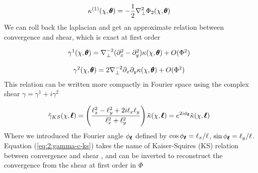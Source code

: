 \begin{equation}
\label{eq:2:kappa-1-lapl}
\kappa^{(1)}(\chi,\pmb{\theta}) = -\frac{1}{2}\nabla_\perp^2 \Phi_2(\chi,\pmb{\theta})
\end{equation}
%
We can roll back the laplacian and get an approximate relation between convergence and shear, which is exact at first order

\begin{equation}
\label{eq:2:gamma-1-lapl}
\begin{matrix}
\gamma^1(\chi,\pmb{\theta}) = \nabla_\perp^{-2} (\partial_x^2-\partial_y^2) \kappa(\chi,\pmb{\theta}) + O(\Phi^2) \\ \\
\gamma^2(\chi,\pmb{\theta}) = 2\nabla_\perp^{-2} \partial_x\partial_y \kappa(\chi,\pmb{\theta}) + O(\Phi^2)
\end{matrix}
\end{equation}
%
This relation can be written more compactly in Fourier space using the complex shear $\gamma=\gamma^1+i\gamma^2$  

\begin{equation}
\label{eq:2:gamma-c-ks}
\tilde{\gamma}_{KS}(\chi,\pmb{\ell}) = \left(\frac{\ell_x^2-\ell_y^2+2i\ell_x\ell_y}{\ell_x^2+\ell_y^2}\right) \tilde{\kappa}(\chi,\pmb{\ell}) = e^{2i\phi_{\pmb{\ell}}} \tilde{\kappa}(\chi,\pmb{\ell})
\end{equation}
%
Where we introduced the Fourier angle $\phi_{\pmb{\ell}}$ defined by $\cos \phi_{\pmb{\ell}} = \ell_x/\ell$, $\sin\phi_{\pmb{\ell}}=\ell_y/\ell$. Equation (\ref{eq:2:gamma-c-ks}) takes the name of Kaiser-Squires (KS) relation between convergence and shear \citep{KaiserSquires}, and can be inverted to reconstruct the convergence from the shear at first order in $\Phi$

